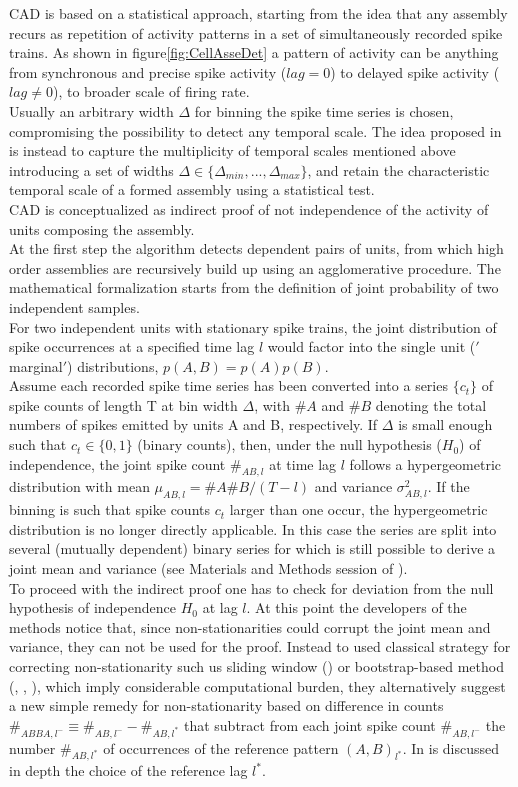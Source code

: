CAD is based on a statistical approach, starting from the idea that any assembly recurs as repetition of activity patterns in a set of simultaneously recorded spike trains. As shown in figure\ref{fig:CellAsseDet} a pattern of activity can be anything from synchronous and precise spike activity ($lag = 0$) to delayed spike activity ($lag\neq 0$), to broader scale of firing rate.\\Usually an arbitrary width $\Delta$ for binning the spike time series is chosen, compromising the possibility to detect any temporal scale. The idea proposed in \cite{RussoDurstewitz} is instead to capture the multiplicity of temporal scales mentioned above introducing a set of widths $\Delta \in \{\Delta_{min},...,\Delta_{max}\}$, and retain the characteristic temporal scale of a formed assembly using a statistical test.\\CAD is conceptualized as indirect proof of not independence of the activity of units composing the assembly.\\At the first step the algorithm detects dependent pairs of units, from which high order assemblies are recursively build up using an agglomerative procedure. The mathematical formalization starts from the definition of joint probability of two independent samples.\\For two independent units with stationary spike trains, the joint distribution of spike occurrences at a specified time lag $l$ would factor into the single unit ($'$marginal$'$) distributions, $p(A,B)=p(A)p(B)$.\\ Assume each recorded spike time series has been converted into a series $\{c_t\}$ of spike counts of length T at bin width $\Delta$, with $\# A$ and $\# B$ denoting the total numbers of spikes emitted by units A and B, respectively. If $\Delta$ is small enough such that $c_t\in\{0,1\}$ (binary counts), then, under the null hypothesis ($H_0$) of independence, the joint spike count $\#_{AB,l}$ at time lag $l$ follows a hypergeometric distribution with mean $\mu_{AB,l}=\# A \# B/(T-l)$ and variance $\sigma^{2}_{AB,l}$. If the binning is such that spike counts $c_t$ larger than one occur, the hypergeometric distribution is no longer directly applicable. In this case the series are split into several (mutually dependent) binary series for which is still possible to derive a joint mean and variance (see Materials and Methods session of \cite{RussoDurstewitz}).\\To proceed with the indirect proof one has to check for deviation from the null hypothesis of independence $H_0$ at lag $l$. At this point the developers of the methods notice that, since non-stationarities could corrupt the joint mean and variance, they can not be used for the proof. Instead to used classical strategy for correcting non-stationarity such us sliding window (\cite{Gruen}) or bootstrap-based method (\cite{Fujisawa}, \cite{Pipa}, \cite{Picado}), which imply considerable computational burden, they alternatively suggest a new simple remedy for non-stationarity based on difference in counts $\#_{ABBA,l^-} \equiv \#_{AB,l^-} - \#_{AB,l^*}$ that subtract from each joint spike count $\#_ {AB,l^-}$ the number $\#_{AB,l^*}$ of occurrences of the reference pattern $(A,B)_{l^*}$. In \cite{RussoDurstewitz} is discussed in depth the choice of the reference lag $l^*$.
